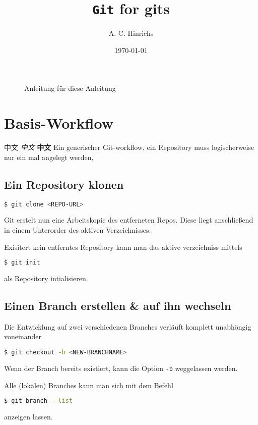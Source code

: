 \documentclass[landscape,a4paper]{cheatsheet}
\title{\texttt{Git} for gits}
\author{A. C. Hinrichs}
\date{\today}
\newcommand{\hwl}{\CJKfamily{hwl}}
\newcommand{\highlight}[1]{{\textsf{\color{primaryColor}#1}}}
\begin{document}
\maketitle

\begin{figure}[H]
  \centering
  \caption{Anleitung für diese Anleitung\protect\footnotemark}
  \label{fig:anleitung}
\end{figure}
\section{Basis-Workflow}
中文 \textit{中文} \textbf{中文} \hwl{中文} Ein generischer Git-workflow, ein \highlight{Repository} muss
logischerweise nur ein mal angelegt werden, 
\subsection{Ein \highlight{Repository} klonen}
\begin{lstlisting}[language=bash]
  $ git clone <REPO-URL>
\end{lstlisting} %
Git erstelt nun eine \highlight{Arbeitskopie} des entferneten
Repos. Diese liegt anschließend in einem Unterorder des aktiven
Verzeichnisses. 

Exisitert kein entferntes Repository kann man das aktive
verzeichniss mittels
\begin{lstlisting}[language=bash]
  $ git init
\end{lstlisting} %
als Repository intialisieren.
\subsection{Einen \highlight{Branch} erstellen \& auf ihn wechseln}
Die Entwicklung auf zwei verschiedenen Branches verläuft komplett
unabhöngig voneinander
\begin{lstlisting}[language=bash]
  $ git checkout -b <NEW-BRANCHNAME>
\end{lstlisting} %
Wenn der Branch bereits existiert, kann die Option \lstinline{-b}
weggelassen werden.

Alle (lokalen) Branches kann man sich mit dem Befehl
\begin{lstlisting}[language=bash]
  $ git branch --list
\end{lstlisting} %
anzeigen lassen.
\end{document}
